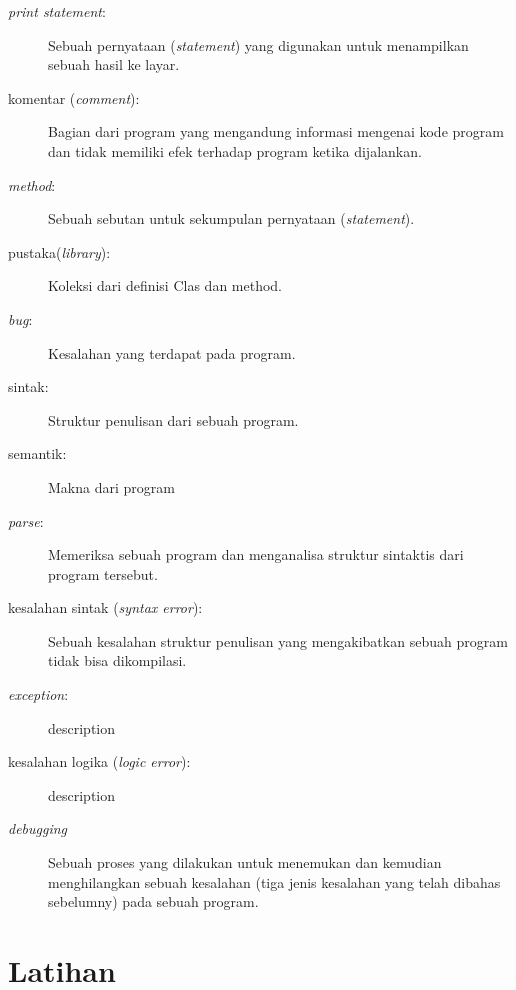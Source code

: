 \begin{description}
    \item[\textit{print statement}:] Sebuah pernyataan (\textit{statement}) yang digunakan untuk menampilkan sebuah hasil ke layar.
    \item[komentar (\textit{comment}):] Bagian dari program yang mengandung informasi mengenai kode program dan tidak memiliki efek terhadap program ketika dijalankan.
    \item[\textit{method}:] Sebuah sebutan untuk sekumpulan pernyataan (\textit{statement}).
    \item[pustaka(\textit{library}):] Koleksi dari definisi Clas dan method.
    \item[\textit{bug}:] Kesalahan yang terdapat pada program.
	\item[sintak:] Struktur penulisan dari sebuah program.
	\item[semantik:] Makna dari program
	\item[\textit{parse}:] Memeriksa sebuah program dan menganalisa struktur sintaktis dari program tersebut.
	\item[kesalahan sintak (\textit{syntax error}):] Sebuah kesalahan struktur penulisan yang mengakibatkan sebuah program tidak bisa dikompilasi.
	\item[\textit{exception}:] description	
	\item[kesalahan logika (\textit{logic error}):] description
	\item[\textit{debugging}] Sebuah proses yang dilakukan untuk menemukan dan kemudian menghilangkan sebuah kesalahan (tiga jenis kesalahan yang telah dibahas sebelumny) pada sebuah program.
\end{description}

	

\section{Latihan}{\tiny {\tiny {\tiny }}}